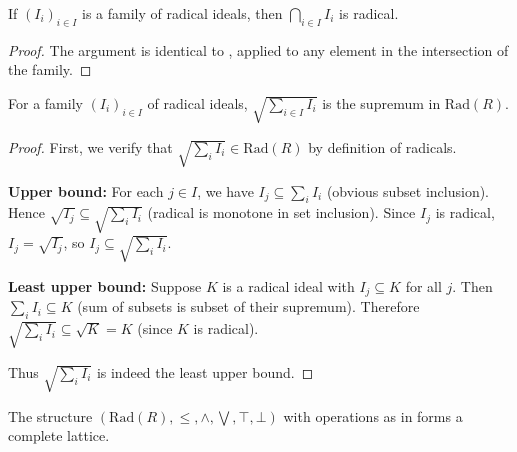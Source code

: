\begin{corollary}
  \label{cor:arbitrary-intersection-radical}
  \leanok
  If $(I_i)_{i \in I}$ is a family of radical ideals, then $\bigcap_{i \in I} I_i$ is radical.
\end{corollary}

\begin{proof}
  \leanok
  The argument is identical to , applied to any element in the intersection of the family.
\end{proof}

\begin{lemma}
  \label{lemma:join-radical-ideals}
  \leanok
  For a family $(I_i)_{i \in I}$ of radical ideals, $\sqrt{\sum_{i \in I} I_i}$ is the supremum in $\mathrm{Rad}(R)$.
\end{lemma}

\begin{proof}
  \leanok
  First, we verify that $\sqrt{\sum_i I_i} \in \mathrm{Rad}(R)$ by definition of radicals.

  \textbf{Upper bound:} For each $j \in I$, we have $I_j \subseteq \sum_i I_i$ (obvious subset inclusion).
  Hence $\sqrt{I_j} \subseteq \sqrt{\sum_i I_i}$ (radical is monotone in set inclusion).
  Since $I_j$ is radical, $I_j = \sqrt{I_j}$, so $I_j \subseteq \sqrt{\sum_i I_i}$.

  \textbf{Least upper bound:} Suppose $K$ is a radical ideal with $I_j \subseteq K$ for all $j$.
  Then $\sum_i I_i \subseteq K$ (sum of subsets is subset of their supremum).
  Therefore $\sqrt{\sum_i I_i} \subseteq \sqrt{K} = K$ (since $K$ is radical).

  Thus $\sqrt{\sum_i I_i}$ is indeed the least upper bound.
\end{proof}

\begin{theorem}
  \label{thm:radical-complete-lattice}
  \leanok
  The structure $(\mathrm{Rad}(R), \leq, \land, \bigvee, \top, \bot)$ with operations as in 
  forms a complete lattice.
\end{theorem}

